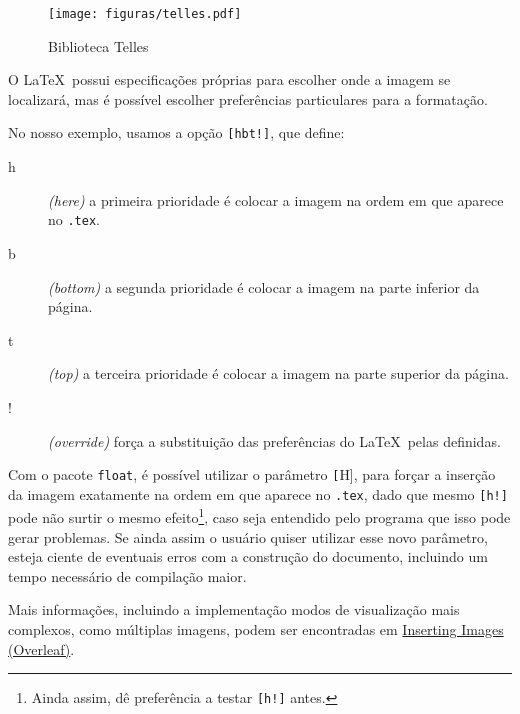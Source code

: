 \begin{figure}[hbt!]
    \centering
    \texttt{[image: figuras/telles.pdf]}
    \caption{Biblioteca Telles}
    \label{fig:telles}
\end{figure}

O \LaTeX\ possui especificações próprias para escolher onde a imagem se localizará, mas é possível escolher preferências particulares para a formatação.

No nosso exemplo, usamos a opção \texttt{[hbt!]}, que define:

\begin{description}
    \item[h] \textit{(here)} a primeira prioridade é colocar a imagem na ordem em que aparece no \texttt{.tex}.
    \item[b] \textit{(bottom)} a segunda prioridade é colocar a imagem na parte inferior da página.
    \item[t] \textit{(top)} a terceira prioridade é colocar a imagem na parte superior da página.
    \item[!] \textit{(override)} força a substituição das preferências do \LaTeX\ pelas definidas.
\end{description}

Com o pacote \texttt{float}, é possível utilizar o parâmetro \texttt[H], para forçar a inserção da imagem exatamente na ordem em que aparece no \texttt{.tex}, dado que mesmo \texttt{[h!]} pode não surtir o mesmo efeito\footnote{Ainda assim, dê preferência a testar \texttt{[h!]} antes.}, caso seja entendido pelo programa que isso pode gerar problemas. Se ainda assim o usuário quiser utilizar esse novo parâmetro, esteja ciente de eventuais erros com a construção do documento, incluindo um tempo necessário de compilação maior.

Mais informações, incluindo a implementação modos de visualização mais complexos, como múltiplas imagens, podem ser encontradas em \href{https://www.overleaf.com/learn/latex/Inserting_Images}{Inserting Images (Overleaf)}.
